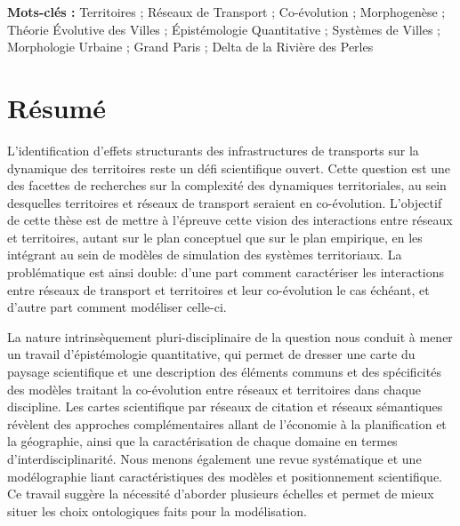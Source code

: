 \documentclass[9pt]{article}
\begin{document}




\noindent\textbf{Mots-clés : } Territoires ; Réseaux de Transport ; Co-évolution ; Morphogenèse ; Théorie Évolutive des Villes ; Épistémologie Quantitative ; Systèmes de Villes ; Morphologie Urbaine ; Grand Paris ; Delta de la Rivière des Perles

\bigskip


\section*{Résumé}



L'identification d'effets structurants des infrastructures de transports sur la dynamique des territoires reste un défi scientifique ouvert. Cette question est une des facettes de recherches sur la complexité des dynamiques territoriales, au sein desquelles territoires et réseaux de transport seraient en co-évolution. L'objectif de cette thèse est de mettre à l'épreuve cette vision des interactions entre réseaux et territoires, autant sur le plan conceptuel que sur le plan empirique, en les intégrant au sein de modèles de simulation des systèmes territoriaux. La problématique est ainsi double: d'une part comment caractériser les interactions entre réseaux de transport et territoires et leur co-évolution le cas échéant, et d'autre part comment modéliser celle-ci.


La nature intrinsèquement pluri-disciplinaire de la question nous conduit à mener un travail d'épistémologie quantitative, qui permet de dresser une carte du paysage scientifique et une description des éléments communs et des spécificités des modèles traitant la co-évolution entre réseaux et territoires dans chaque discipline. Les cartes scientifique par réseaux de citation et réseaux sémantiques révèlent des approches complémentaires allant de l'économie à la planification et la géographie, ainsi que la caractérisation de chaque domaine en termes d'interdisciplinarité. Nous menons également une revue systématique et une modélographie liant caractéristiques des modèles et positionnement scientifique. Ce travail suggère la nécessité d'aborder plusieurs échelles et permet de mieux situer les choix ontologiques faits pour la modélisation.
\end{document}
